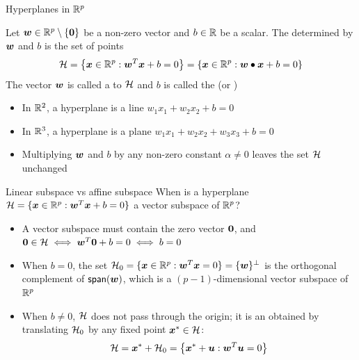 \documentclass[aspectratio=169]{beamer}\usepackage[]{graphicx}\usepackage[]{xcolor}
\begin{document}


\begin{frame}{Hyperplanes in $\IR^p$}
    \begin{importantdefinition}[Hyperplane in $\IR^p$]
        Let $\bw \in \IR^p \setminus \{\b0\}$ be a non-zero vector and $b \in \mathbb{R}$ be a scalar. The  determined by $\bm{w}$ and $b$ is the set of points
        \[
            \mathcal{H} = \left\{\bm{x} \in \mathbb{R}^p : \bm{w}^T \bm{x} + b = 0\right\} = \left\{\bm{x} \in \mathbb{R}^p : \bm{w} \bullet \bm{x} + b = 0\right\}
        \]
        The vector $\bm{w}$ is called a  to $\mathcal{H}$ and $b$ is called the  (or )
    \end{importantdefinition}
    \vfill
    \begin{itemize}
        \item In $\mathbb{R}^2$, a hyperplane is a line $w_1 x_1 + w_2 x_2 + b = 0$
        \item In $\mathbb{R}^3$, a hyperplane is a plane $w_1 x_1 + w_2 x_2 + w_3 x_3 + b = 0$
        \item Multiplying $\bm{w}$ and $b$ by any non-zero constant $\alpha \neq 0$ leaves the set $\mathcal{H}$ unchanged
    \end{itemize}
\end{frame}


\begin{frame}{Linear subspace vs affine subspace}
    When is a hyperplane $\mathcal{H} = \{\bm{x} \in \mathbb{R}^p : \bm{w}^T \bm{x} + b = 0\}$ a vector subspace of $\IR^p$?
    \vfill
    \begin{itemize}
        \item A vector subspace must contain the zero vector $\b0$, and $\b0 \in \H \iff \bw^T \b0 + b = 0 \iff b = 0$
        \vfill
        \item When $b = 0$, the set $\mathcal{H}_0 = \{\bm{x} \in \mathbb{R}^p : \bm{w}^T \bm{x} = 0\} = \{\bm{w}\}^\perp$ is the orthogonal complement of $\mathsf{span}(\bm{w})$, which is a $(p-1)$-dimensional vector subspace of $\IR^p$
        \vfill
        \item When $b \neq 0$, $\mathcal{H}$ does not pass through the origin; it is an  obtained by translating $\mathcal{H}_0$ by any fixed point $\bm{x}^* \in \mathcal{H}$:
        \[
            \mathcal{H} = \bm{x}^* + \mathcal{H}_0 = \left\{\bm{x}^* + \bm{u} : \bm{w}^T \bm{u} = 0\right\}
        \]
    \end{itemize}
\end{frame}
\end{document}

